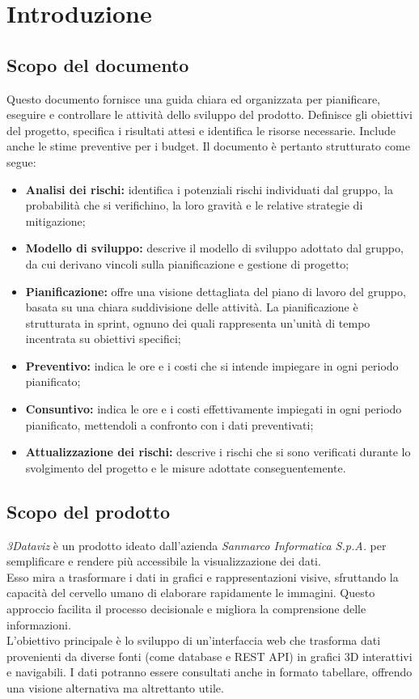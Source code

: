 \section{Introduzione}
\subsection{Scopo del documento}
Questo documento fornisce una guida chiara ed organizzata per pianificare, eseguire e controllare le attività dello sviluppo del prodotto.
Definisce gli obiettivi del progetto, specifica i risultati attesi e identifica le risorse necessarie. 
Include anche le stime preventive per i budget.
Il documento è pertanto strutturato come segue:
\begin{itemize}
      \item \textbf{Analisi dei rischi:} identifica i potenziali rischi individuati
            dal gruppo, la probabilità che si verifichino, la loro gravità e le relative
            strategie di mitigazione;
      \item \textbf{Modello di sviluppo:} descrive il modello di sviluppo adottato dal
            gruppo, da cui derivano vincoli sulla pianificazione e gestione di progetto;
      \item \textbf{Pianificazione:} offre una visione dettagliata del piano di lavoro
            del gruppo, basata su una chiara suddivisione delle attività. La pianificazione
            è strutturata in sprint, ognuno dei quali rappresenta un'unità di tempo
            incentrata su obiettivi specifici;
      \item \textbf{Preventivo:} indica le ore e i costi che si intende impiegare
            in ogni periodo pianificato;
      \item \textbf{Consuntivo:} indica le ore e i costi effettivamente impiegati
            in ogni periodo pianificato, mettendoli a confronto con i dati preventivati;
      \item \textbf{Attualizzazione dei rischi:} descrive i rischi che si sono verificati
            durante lo svolgimento del progetto e le misure adottate conseguentemente.
\end{itemize}

\subsection{Scopo del prodotto}
\textit{3Dataviz} è un prodotto ideato dall'azienda \textit{Sanmarco Informatica S.p.A.} per semplificare e rendere più accessibile la visualizzazione dei dati.\\
Esso mira a trasformare i dati in grafici e rappresentazioni visive, sfruttando la capacità del cervello umano di elaborare rapidamente le immagini. 
Questo approccio facilita il processo decisionale e migliora la comprensione delle informazioni.\\
L’obiettivo principale è lo sviluppo di un’interfaccia web che trasforma dati provenienti da diverse fonti (come database e REST API) in grafici 3D interattivi e navigabili. 
I dati potranno essere consultati anche in formato tabellare, offrendo una visione alternativa ma altrettanto utile.  

